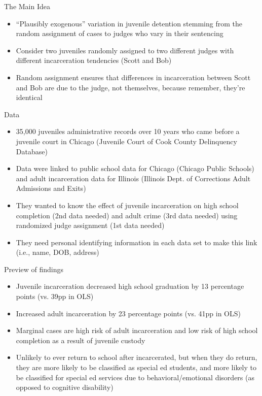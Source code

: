 \documentclass{beamer}
\begin{document}
\begin{frame}{The Main Idea}

	\begin{itemize}
	\item ``Plausibly exogenous'' variation in juvenile detention stemming from the random assignment of cases to judges who vary in their sentencing
	\item Consider two juveniles randomly assigned to two different judges with different incarceration tendencies (Scott and Bob)
	\item Random assignment ensures that differences in incarceration between Scott and Bob are due to the judge, not themselves, because remember, they're identical
	\end{itemize}
\end{frame}

\begin{frame}{Data}

	\begin{itemize}
	\item 35,000 juveniles administrative records over 10 years who came before a juvenile court in Chicago (Juvenile Court of Cook County Delinquency Database)
	\item Data were linked to public school data for Chicago (Chicago Public Schools) and adult incarceration data for Illinois (Illinois Dept. of Corrections Adult Admissions and Exits)
	\item They wanted to know the effect of juvenile incarceration on high school completion (2nd data needed) and adult crime (3rd data needed) using randomized judge assignment (1st data needed)
	\item They need personal identifying information in each data set to make this link (i.e., name, DOB, address)
	\end{itemize}
	
\end{frame}

\begin{frame}{Preview of findings}

	\begin{itemize}
	\item Juvenile incarceration decreased high school graduation by 13 percentage points (vs. 39pp in OLS)
	\item Increased adult incarceration by 23 percentage points (vs. 41pp in OLS)
	\item Marginal cases are high risk of adult incarceration and low risk of high school completion as a result of juvenile custody
	\item Unlikely to ever return to school after incarcerated, but when they do return, they are more likely to be classified as special ed students, and more likely to be classified for special ed services due to behavioral/emotional disorders (as opposed to cognitive disability)
	\end{itemize}
	
\end{frame}
\end{document}
